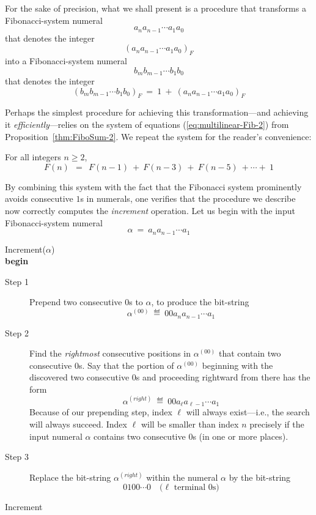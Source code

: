 
\smallskip

\noindent
For the sake of precision, what we shall present is a procedure that transforms a Fibonacci-system numeral
\[ a_n a_{n-1} \cdots a_1 a_0 \]
that denotes the integer
\[ (a_n a_{n-1} \cdots a_1 a_0)_F \]
into a Fibonacci-system numeral
\[ b_m b_{m-1} \cdots b_1 b_0 \]
that denotes the integer
\[ (b_m b_{m-1} \cdots b_1 b_0)_F \ = \ 1 \ + \ (a_n a_{n-1} \cdots a_1 a_0)_F \]

Perhaps the simplest procedure for achieving this transformation---and achieving it {\em efficiently}---relies on the system of equations (\ref{eq:multilinear-Fib-2}) from Proposition~\ref{thm:FiboSum-2}.  We repeat the system for the reader's convenience:

\medskip

\noindent For all integers $n \geq 2$,
\[ F(n) \ \ = \ \ F(n-1) \ + \ F(n-3) \ + \ F(n-5) \ + \cdots + \ 1 \]

\medskip

By combining this system with the fact that the Fibonacci system prominently avoids consecutive $1$s in numerals, one verifies that the procedure we describe now correctly computes the {\em increment} operation.  Let us begin with the input Fibonacci-system numeral
\[ \alpha \ = \  a_n a_{n-1} \cdots a_1 \]

\bigskip

 {\sf Increment}($\alpha$) \\
{\bf begin}
\begin{description}
\item[{\sf Step} 1]
Prepend two consecutive $0$s to $\alpha$, to produce the bit-string
\[  \alpha^{(00)} \ \eqdef \  0 0 a_n a_{n-1} \cdots a_1 \]

\item[{\sf Step} 2]
Find the {\em rightmost} consecutive positions in $\alpha^{(00)}$ that contain two consecutive $0$s.  Say that the portion of $\alpha^{(00)}$ beginning with the discovered two consecutive $0$s and proceeding rightward from there has the form
\[  \alpha^{(right)} \ \eqdef \  0 0 a_\ell a_{\ell-1} \cdots a_1 \]
Because of our prepending step, index $\ell$ will always exist---i.e., the search will always succeed.   Index $\ell$ will be smaller than index $n$ precisely if the input numeral $\alpha$ contains two consecutive $0$s (in one or more places).

\item[{\sf Step} 3]
Replace the bit-string $\alpha^{(right)}$ within the numeral $\alpha$ by the bit-string
\[ 0 1 0 0 \cdots 0 \ \ \ \mbox{ ($\ell$ terminal $0$s)} \]


\end{description}
 {\sf Increment}

